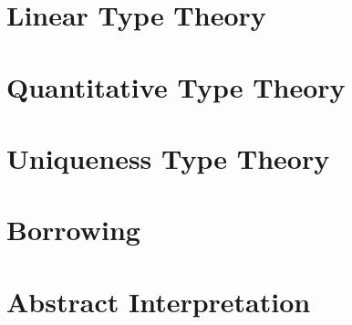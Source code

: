 \section{Linear Type Theory}

\section{Quantitative Type Theory}

\section{Uniqueness Type Theory}\label{sec:uniqueness}

\section{Borrowing}\label{sec:borrowingbackground}

\section{Abstract Interpretation}